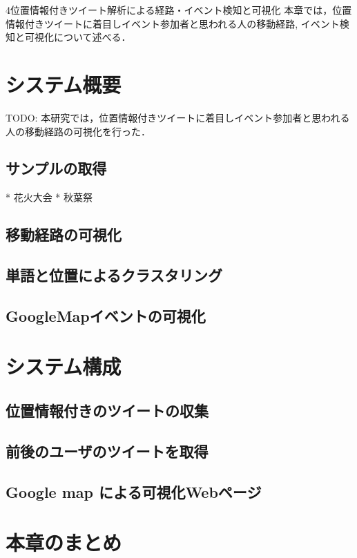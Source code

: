 \chapterhead
{4}{位置情報付きツイート解析による経路・イベント検知と可視化}
{本章では，位置情報付きツイートに着目しイベント参加者と思われる人の移動経路, イベント検知と可視化について述べる．}


\section{システム概要}
TODO: 本研究では，位置情報付きツイートに着目しイベント参加者と思われる人の移動経路の可視化を行った．

\subsection{サンプルの取得}
* 花火大会
* 秋葉祭
\subsection{移動経路の可視化}
\subsection{単語と位置によるクラスタリング}
\subsection{GoogleMapイベントの可視化}

\section{システム構成}
\subsection{位置情報付きのツイートの収集}
\subsection{前後のユーザのツイートを取得}
\subsection{Google map による可視化Webページ}

\newpage

\section{本章のまとめ}





\newpage
